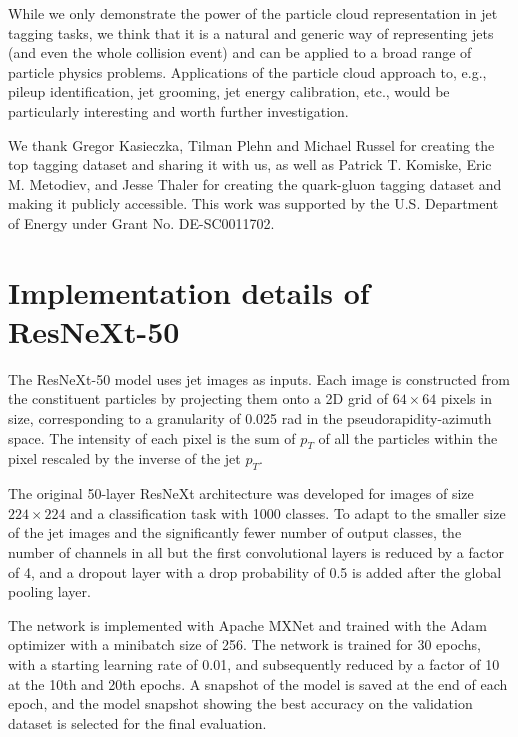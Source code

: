 \documentclass[aps,prd,longbibliography,reprint,amsmath,amssymb,amsfonts]{revtex4-1}
\begin{document}
While we only demonstrate the power of the particle cloud representation in jet tagging tasks, we think that it is a natural and generic way of representing jets (and even the whole collision event) and can be applied to a broad range of particle physics problems. Applications of the particle cloud approach to, e.g., pileup identification, jet grooming, jet energy calibration, etc., would be particularly interesting and worth further investigation.
 
\begin{acknowledgments}
We thank Gregor Kasieczka, Tilman Plehn and Michael Russel for creating the top tagging dataset and sharing it with us, as well as Patrick T. Komiske, Eric M. Metodiev, and Jesse Thaler for creating the quark-gluon tagging dataset and making it publicly accessible. 
This work was supported by the U.S. Department of Energy under Grant No. DE-SC0011702. 
\end{acknowledgments}





\appendix

\section{Implementation details of ResNeXt-50}
\label{app:arch-resnext50}

The ResNeXt-50 model uses jet images as inputs. Each image is constructed from the constituent particles by projecting them onto a 2D grid of $64\times64$ pixels in size, corresponding to a granularity of 0.025 rad in the pseudorapidity-azimuth space. The intensity of each pixel is the sum of $p_{T}$ of all the particles within the pixel rescaled by the inverse of the jet $p_{T}$. 

The original 50-layer ResNeXt architecture \cite{xie2017aggregated} was developed for images of size $224\times224$ and a classification task with 1000 classes. To adapt to the smaller size of the jet images and the significantly fewer number of output classes, the number of channels in all but the first convolutional layers is reduced by a factor of 4, and a dropout layer with a drop probability of 0.5 is added after the global pooling layer. 

The network is implemented with Apache MXNet and trained with the Adam optimizer with a minibatch size of 256. The network is trained for 30 epochs, with a starting learning rate of 0.01, and subsequently reduced by a factor of 10 at the 10th and 20th epochs. A snapshot of the model is saved at the end of each epoch, and the model snapshot showing the best accuracy on the validation dataset is selected for the final evaluation. 
\end{document}

